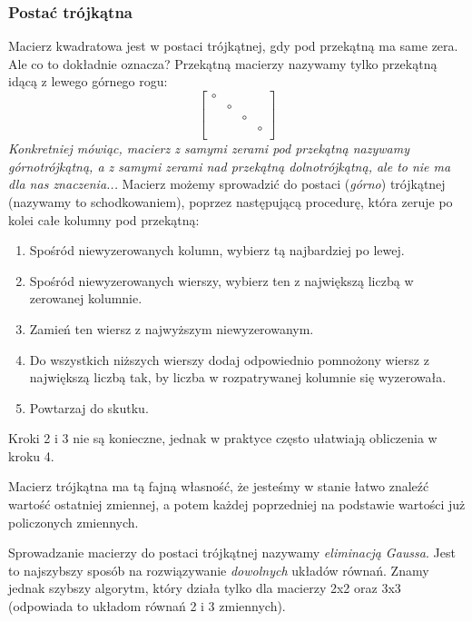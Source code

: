 \documentclass{article}
\theoremstyle{remark}
\begin{document}
\subsubsection{Postać trójkątna}
Macierz kwadratowa jest w postaci trójkątnej, gdy pod przekątną ma same zera.
Ale co to dokładnie oznacza? Przekątną macierzy nazywamy tylko przekątną idącą z lewego górnego
rogu:
\[\left[
  \begin{array}{llll}
    \circ& && \\
    &\circ&&\\
    &&\circ&\\
    &&&\circ\\
  \end{array}
\right]\]
\textit{Konkretniej mówiąc, macierz z samymi zerami pod przekątną nazywamy górnotrójkątną,
a z samymi zerami nad przekątną dolnotrójkątną,
ale to nie ma dla nas znaczenia...}
Macierz możemy sprowadzić do postaci (\textit{górno}) trójkątnej (nazywamy to schodkowaniem), 
poprzez następującą procedurę, która zeruje po kolei całe kolumny pod przekątną:
\begin{enumerate}
  \item Spośród niewyzerowanych kolumn, wybierz tą najbardziej po lewej.
  \item Spośród niewyzerowanych wierszy, wybierz ten z największą liczbą w zerowanej 
  kolumnie.
  \item Zamień ten wiersz z najwyższym niewyzerowanym. 
  \item Do wszystkich niższych wierszy dodaj odpowiednio pomnożony wiersz z największą
  liczbą tak, by liczba w rozpatrywanej kolumnie się wyzerowała.
  \item Powtarzaj do skutku.
\end{enumerate}
Kroki 2 i 3 nie są konieczne, jednak w praktyce często ułatwiają obliczenia w kroku 4.

Macierz trójkątna ma tą fajną własność, że jesteśmy w stanie łatwo znaleźć wartość 
ostatniej zmiennej, a potem każdej poprzedniej na podstawie wartości już policzonych zmiennych.

Sprowadzanie macierzy do postaci trójkątnej nazywamy \textit{eliminacją Gaussa}.
Jest to najszybszy sposób na rozwiązywanie \textit{dowolnych} układów równań. Znamy jednak
szybszy algorytm, który działa tylko dla macierzy 2x2 oraz 3x3 (odpowiada to układom
równań 2 i 3 zmiennych).
\end{document}
